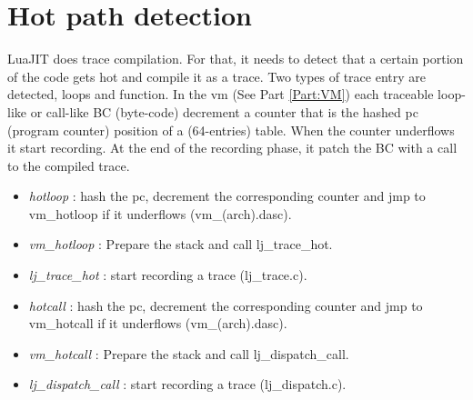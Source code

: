 \section{Hot path detection}
\label{Sec:hot-path}
LuaJIT does trace compilation. For that, it needs to detect that a certain
portion of the code gets hot and compile it as a trace. Two types of trace entry
are detected, loops and function. In the vm (See Part \ref{Part:VM}) each
traceable loop-like or call-like BC (byte-code) decrement a counter that is the
hashed pc (program counter) position of a (64-entries) table. When the counter underflows it start recording. At the end of the recording phase, it patch the
BC with a call to the compiled trace.


\begin{itemize}
	\item \emph{hotloop} : hash the pc, decrement the corresponding counter and
jmp to vm\_hotloop if it underflows (vm\_(arch).dasc).
	\item \emph{vm\_hotloop} : Prepare the stack and call lj\_trace\_hot.
	\item \emph{lj\_trace\_hot} : start recording a trace (lj\_trace.c).
\end{itemize}


\begin{itemize}
	\item \emph{hotcall} : hash the pc, decrement the corresponding counter and
jmp to vm\_hotcall if it underflows (vm\_(arch).dasc).
	\item \emph{vm\_hotcall} : Prepare the stack and call lj\_dispatch\_call.
	\item \emph{lj\_dispatch\_call} : start recording a trace (lj\_dispatch.c).
\end{itemize}